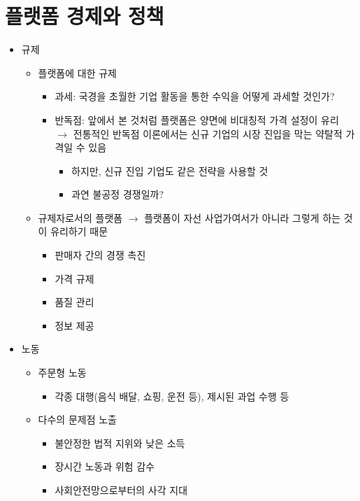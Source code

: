 \section{플랫폼 경제와 정책}
\begin{itemize}
\item 규제 
	\begin{itemize}
	\item 플랫폼에 대한 규제
		\begin{itemize}
		\item 과세: 국경을 초월한 기업 활동을 통한 수익을 어떻게 과세할 것인가?
		\item 반독점: 앞에서 본 것처럼 플랫폼은 양면에 비대칭적 가격 설정이 유리 $\rightarrow$ 전통적인 반독점 이론에서는 신규 기업의 시장 진입을 막는 약탈적 가격일 수 있음
			\begin{itemize}
			\item 하지만, 신규 진입 기업도 같은 전략을 사용할 것
			\item 과연 불공정 경쟁일까?
			\end{itemize}
		\end{itemize}
	\item 규제자로서의 플랫폼 $\rightarrow$ 플랫폼이 자선 사업가여서가 아니라 그렇게 하는 것이 유리하기 때문
		\begin{itemize}
		\item 판매자 간의 경쟁 촉진
		\item 가격 규제
		\item 품질 관리
		\item 정보 제공
		\end{itemize}
	\end{itemize}
\item 노동
	\begin{itemize}
	\item 주문형 노동
		\begin{itemize}
		\item 각종 대행(음식 배달, 쇼핑, 운전 등), 제시된 과업 수행 등
		\end{itemize}	
	\item 다수의 문제점 노출
		\begin{itemize}
		\item 불안정한 법적 지위와 낮은 소득
		\item 장시간 노동과 위험 감수
		\item 사회안전망으로부터의 사각 지대
		\end{itemize}
	\end{itemize}
\end{itemize}


